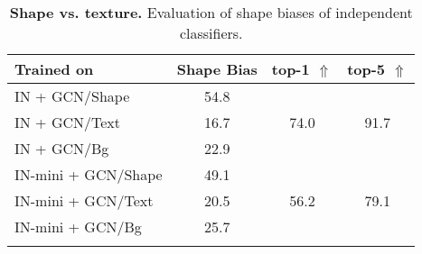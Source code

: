 \begin{table}[H]
    \captionsetup{skip=1mm}
    \caption{\textbf{Shape vs. texture.} Evaluation of shape biases of independent classifiers.}
    \label{tab:mini-shape}
    \centering
    \footnotesize
    \setlength{\aboverulesep}{0.95pt}
    \setlength{\belowrulesep}{0.95pt}

\begin{tabular}{lccc@{}}
\toprule
\textbf{Trained on} & \textbf{Shape Bias} & \textbf{top-1} $\Uparrow$ & \textbf{top-5} $\Uparrow$ \\ \midrule
\cellcolor{blue!10}IN + GCN/Shape & 54.8 & & \\
\arrayrulecolor{lightgray}\cmidrule(lr){2-2}
\cellcolor{blue!10}IN + GCN/Text & 16.7 & 74.0 & 91.7 \\
\arrayrulecolor{lightgray}\cmidrule(lr){2-2}
\cellcolor{blue!10}IN + GCN/Bg & 22.9 & & \\
\arrayrulecolor{black}\midrule
IN-mini + GCN/Shape & 49.1 & & \\
\arrayrulecolor{lightgray}\cmidrule(lr){2-2}
IN-mini + GCN/Text & 20.5 & 56.2 & 79.1 \\
\arrayrulecolor{lightgray}\cmidrule(lr){2-2}
IN-mini + GCN/Bg & 25.7 & & \\
\arrayrulecolor{black}\bottomrule
\end{tabular}
\end{table}

